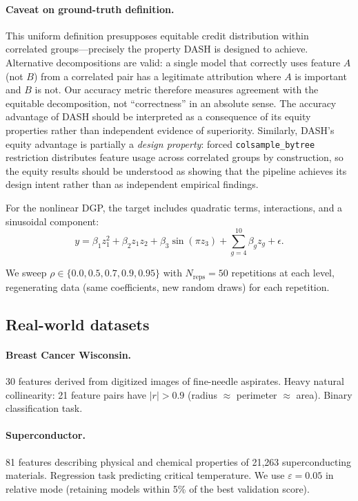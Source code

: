 \documentclass[11pt]{article}
\newcommand{\dash}{\textsc{DASH}}
\newcommand{\rhovar}{\rho}
\begin{document}
\paragraph{Caveat on ground-truth definition.}
This uniform definition presupposes equitable credit distribution
within correlated groups---precisely the property \dash{} is designed
to achieve. Alternative decompositions are valid: a single model that
correctly uses feature $A$ (not $B$) from a correlated pair has a
legitimate attribution where $A$ is important and $B$ is not. Our
accuracy metric therefore measures agreement with the equitable
decomposition, not ``correctness'' in an absolute sense. The accuracy
advantage of \dash{} should be interpreted as a consequence of its
equity properties rather than independent evidence of superiority.
Similarly, \dash{}'s equity advantage is partially a \emph{design
property}: forced \texttt{colsample\_bytree} restriction distributes
feature usage across correlated groups by construction, so the equity
results should be understood as showing that the pipeline achieves
its design intent rather than as independent empirical findings.

For the nonlinear DGP, the target includes quadratic terms, interactions,
and a sinusoidal component:
\begin{equation}
  y = \beta_1 z_1^2 + \beta_2 z_1 z_2 + \beta_3 \sin(\pi z_3) +
  \sum_{g=4}^{10} \beta_g z_g + \epsilon.
\end{equation}

We sweep $\rhovar \in \{0.0, 0.5, 0.7, 0.9, 0.95\}$ with $N_{\text{reps}}
= 50$ repetitions at each level, regenerating data (same coefficients, new
random draws) for each repetition.

\subsection{Real-world datasets}

\paragraph{Breast Cancer Wisconsin.}
30 features derived from digitized images of fine-needle aspirates. Heavy
natural collinearity: 21 feature pairs have $|r| > 0.9$ (radius $\approx$
perimeter $\approx$ area). Binary classification task.

\paragraph{Superconductor.}
81 features describing physical and chemical properties of 21,263
superconducting materials. Regression task predicting critical temperature.
We use $\varepsilon = 0.05$ in relative mode (retaining models within
5\% of the best validation score).
\end{document}
